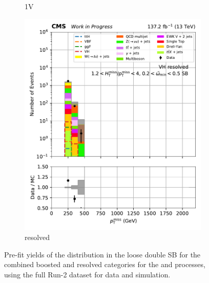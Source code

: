 \begin{figure}[htbp]
\begin{subfigure}[b]{0.24\textwidth}
        \caption{\VH 1V}
    \end{subfigure}
    \hfill
    \begin{subfigure}[b]{0.24\textwidth}
        \includegraphics[width=\textwidth]{figures/region_plots/2016to18/sideband_1/VH_resolved.pdf}
        \caption{\VH resolved}
    \end{subfigure}
    \caption[Pre-fit yields of the \ptmiss distribution in the loose double sideband for the combined boosted and resolved categories for the \ttH and \VH processes, using the full Run-2 dataset for data and simulation]{Pre-fit yields of the \ptmiss distribution in the loose double \gls{SB} for the combined boosted and resolved categories for the \ttH and \VH processes, using the full Run-2 dataset for data and simulation.}
    \label{fig:htoinv_sb_yields_comb2016to18_loose_double}
\end{figure}
